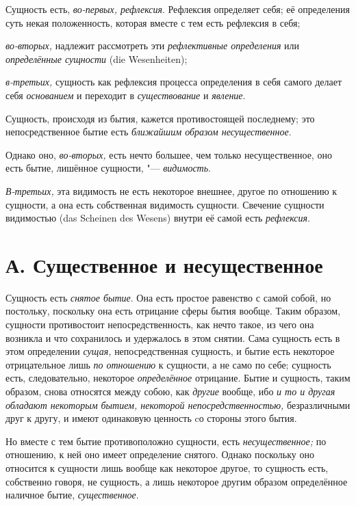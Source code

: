 Сущность есть, {\em во-первых, рефлексия}. Рефлексия определяет себя;
её определения суть некая положенность, которая вместе с тем есть
рефлексия в себя;

{\em во-вторых,} надлежит рассмотреть эти {\em рефлективные определения} или
{\em определённые сущности} (die Wesenheiten);

{\em в-третьих,} сущность как рефлексия процесса
определения в себя самого делает себя {\em основанием}
и переходит в {\em существование} и {\em явление}.


Сущность, происходя из бытия, кажется
противостоящей последнему; это непосредственное бытие есть
{\em ближайшим образом несущественное}.

Однако оно, {\em во-вторых,} есть нечто большее, чем только
несущественное, оно есть бытие, лишённое сущности, "--- {\em видимость}.

{\em В-третьих,} эта видимость не есть некоторое
внешнее, другое по отношению к сущности, а она есть собственная видимость
сущности. Свечение сущности видимостью (das Scheinen des Wesens) внутри её
самой есть {\em рефлексия}.

\section[А. Существенное и несущественное]{А. Существенное и несущественное}

Сущность есть {\em снятое бытие}.
Она есть простое равенство с самой собой, но постольку, поскольку
она есть отрицание сферы бытия вообще. Таким образом, сущности противостоит
непосредственность, как нечто такое, из чего она возникла и что сохранилось
и удержалось в этом снятии. Сама сущность есть в этом определении
{\em сущая,} непосредственная сущность, и бытие есть
некоторое отрицательное лишь {\em по отношению} к
сущности, а не само по себе; сущность есть, следовательно, некоторое
{\em определённое} отрицание. Бытие и сущность, таким
образом, снова относятся между собою, как {\em другие} вообще, ибо
{\em и то и другая обладают некоторым бытием, некоторой непосредственностью,}
безразличными друг к другу, и имеют одинаковую ценность cо стороны этого бытия.

Но вместе с тем бытие противоположно сущности, есть
{\em несущественное;} по отношению, к ней оно имеет
определение снятого. Однако поскольку оно относится к сущности лишь вообще
как некоторое другое, то сущность есть, собственно говоря, не сущность, а
лишь некоторое другим образом определённое наличное бытие,
{\em существенное}.

